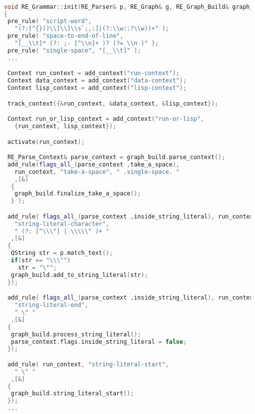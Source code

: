 \begin{lstlisting}[caption={Excerpt from a Hypergraph-Oriented Parser}, 
  language = C++, numbers = none,label={lst:rzsyn},
    basicstyle = \ttfamily\bfseries\footnotesize, linewidth = \linewidth]

void RE_Grammar::init(RE_Parser& p, RE_Graph& g, RE_Graph_Build& graph_build)
{
 pre_rule( "script-word", 
   "(?:[^{}()\\[\\]\\s`;,:]|(?:\\w::?\\w))+" );
 pre_rule( "space-to-end-of-line", 
   "[__\\t]* (?: ;- [^\\n]+ )? (?= \\n )" );
 pre_rule( "single-space", "[__\\t]" );
 ...

 Context run_context = add_context("run-context");
 Context data_context = add_context("data-context");
 Context lisp_context = add_context("lisp-context");

 track_context({&run_context, &data_context, &lisp_context});

 Context run_or_lisp_context = add_context("run-or-lisp",
   {run_context, lisp_context});

 activate(run_context);

 RE_Parse_Context& parse_context = graph_build.parse_context();
 add_rule(flags_all_(parse_context ,take_a_space), 
   run_context, "take-a-space", " .single-space. "
   ,[&]
  {
   graph_build.finalize_take_a_space();
  } );

 add_rule( flags_all_(parse_context ,inside_string_literal), run_context,
   "string-literal-character",
   " (?: [^\\\"] | \\\\\" )+ "
  ,[&]
 {
  QString str = p.match_text();
  if(str == "\\\"")
    str = "\"";
  graph_build.add_to_string_literal(str);
 });

 add_rule( flags_all_(parse_context ,inside_string_literal), run_context,
   "string-literal-end",
   " \" "
  ,[&]
 {
  graph_build.process_string_literal();
  parse_context.flags.inside_string_literal = false;
 });

 add_rule( run_context, "string-literal-start",
   " \" "
  ,[&]
 {
  graph_build.string_literal_start();
 });
 ...
 

\end{lstlisting}

